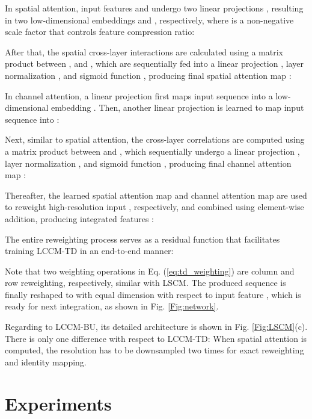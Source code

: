 \documentclass[lettersize,journal]{IEEEtran}
\begin{document}
In spatial attention, input features  and  undergo two linear projections , resulting in two low-dimensional embeddings  and , respectively, where  is a non-negative scale factor that controls feature compression ratio:




After that, the spatial cross-layer interactions are calculated using a matrix product between , and , which are sequentially fed into a linear projection , layer normalization , and sigmoid function , producing final spatial attention map :






In channel attention, a linear projection  first maps input sequence  into a low-dimensional embedding . Then, another linear projection  is learned to map input sequence  into :




Next, similar to spatial attention, the cross-layer correlations are computed using a matrix product between  and , which sequentially undergo a linear projection  , layer normalization , and sigmoid function , producing final channel attention map :


Thereafter, the learned spatial attention map  and channel attention map  are used to reweight high-resolution input , respectively, and combined using element-wise addition, producing integrated features :


The entire reweighting process serves as a residual function that facilitates training LCCM-TD in an end-to-end manner:


Note that two weighting operations in Eq. (\ref{eq:td_weighting}) are column and row reweighting, respectively, similar with LSCM. The produced sequence  is finally reshaped to  with equal dimension with respect to input feature , which is ready for next integration, as shown in Fig. \ref{Fig:network}.



Regarding to LCCM-BU, its detailed architecture is shown in Fig. \ref{Fig:LSCM}(c). There is only one difference with respect to LCCM-TD: When spatial attention is computed, the resolution has to be downsampled two times for exact reweighting and identity mapping.







\section{Experiments}\label{sec:Experimence}
\end{document}
